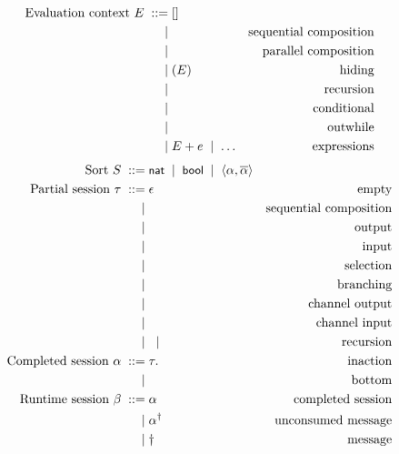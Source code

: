 \documentclass{article}
\begin{document}
\begin{align*}
  \text{Evaluation context}\ E
    \grmeq & []                        & \text{}\\
    \grmor & \seqcomp EP               & \text{sequential composition}\\
    \grmor & \parcomp EP               & \text{parallel composition}\\
    \grmor & \restrict uE              & \text{hiding}\\
    \grmor & \recur DE                 & \text{recursion}\\
    \grmor & \cond EPQ                 & \text{conditional}\\
    \grmor & \outwhile kEP             & \text{outwhile}\\
    \grmor & E + e \grmor \dots        & \text{expressions}\\
\end{align*}
\begin{align*}
  \text{Sort}\ S
    \grmeq & \keyword{nat} \grmor \keyword{bool}
    \grmor \langle\alpha,\overline\alpha\rangle & \\
  \text{Partial session}\ \tau
    \grmeq & \epsilon                 & \text{empty}\\
    \grmor & \seqcompType \tau\tau    & \text{sequential composition}\\
    \grmor & \sendType S{}            & \text{output}\\
    \grmor & \recvType S{}            & \text{input}\\
    \grmor & \selectType{l}{\tau}     & \text{selection}\\
    \grmor & \branchType{l}\tau       & \text{branching}\\
    \grmor & \hosendType{\alpha}{}    & \text{channel output}\\
    \grmor & \horecvType{\alpha}{}    & \text{channel input}\\
    \grmor & \recurType{x}{\tau} \grmor \recvarType x
                                      & \text{recursion}\\
  \text{Completed session}\ \alpha
    \grmeq & \tau.\EndType            & \text{inaction}\\
    \grmor & \bottomType              & \text{bottom}\\
  \text{Runtime session}\ \beta
    \grmeq & \alpha                   & \text{completed session}\\
    \grmor & \alpha^\dagger           & \text{unconsumed message}\\
    \grmor & \dagger                  & \text{message}\\
\end{align*}
\end{document}
